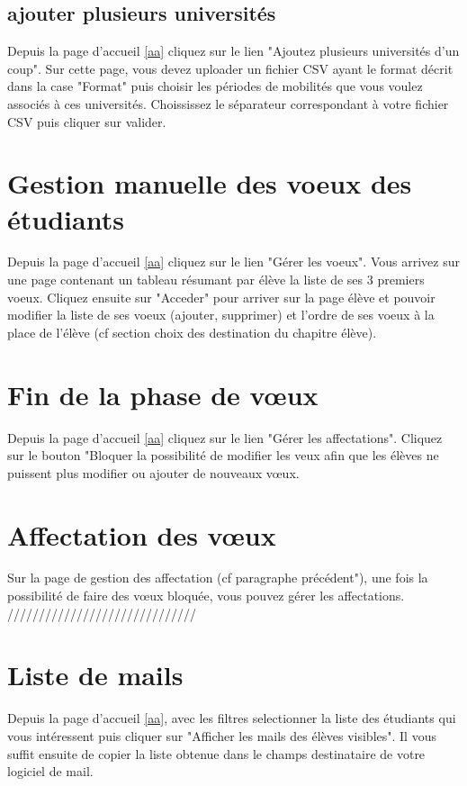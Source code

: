 \subsection{ajouter plusieurs universités} 

Depuis la page d'accueil \ref{aa} cliquez sur le lien "Ajoutez plusieurs universités d'un coup". Sur cette page, vous devez uploader un fichier CSV ayant le format décrit dans la case "Format" puis choisir les périodes de mobilités que vous voulez associés à ces universités. Choississez le séparateur correspondant à votre fichier CSV puis cliquer sur valider.

\section{Gestion manuelle des voeux des étudiants}

Depuis la page d'accueil \ref{aa} cliquez sur le lien "Gérer les voeux". Vous arrivez sur une page contenant un tableau résumant par élève la liste de ses 3 premiers voeux. Cliquez ensuite sur "Acceder" pour arriver sur la page élève et pouvoir modifier la liste de ses voeux (ajouter, supprimer) et l'ordre de ses voeux à la place de l'élève (cf section choix des destination du chapitre élève).

\section{Fin de la phase de vœux} 

Depuis la page d'accueil \ref{aa} cliquez sur le lien "Gérer les affectations". Cliquez sur le bouton "Bloquer la possibilité de modifier les veux afin que les élèves ne puissent plus modifier ou ajouter de nouveaux vœux.

\section{Affectation des vœux}

Sur la page de gestion des affectation (cf paragraphe précédent"), une fois la possibilité de faire des vœux bloquée, vous pouvez gérer les affectations. 
////////////////////////////// 

\section{Liste de mails}

Depuis la page d'accueil \ref{aa}, avec les filtres selectionner la liste des étudiants qui vous intéressent puis cliquer sur "Afficher les mails des élèves visibles". Il vous suffit ensuite de copier la liste obtenue dans le champs destinataire de votre logiciel de mail.


